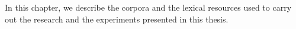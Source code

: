In this chapter, we describe the corpora and the lexical resources used to carry out the research and the experiments presented in this thesis.